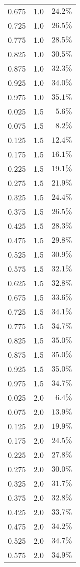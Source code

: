 \begin{longtable}{rrr}
0.675 & 1.0 & $24.2\%$ \\ 
0.725 & 1.0 & $26.5\%$ \\ 
0.775 & 1.0 & $28.5\%$ \\ 
0.825 & 1.0 & $30.5\%$ \\ 
0.875 & 1.0 & $32.3\%$ \\ 
0.925 & 1.0 & $34.0\%$ \\ 
0.975 & 1.0 & $35.1\%$ \\ 
0.025 & 1.5 & $5.6\%$ \\ 
0.075 & 1.5 & $8.2\%$ \\ 
0.125 & 1.5 & $12.4\%$ \\ 
0.175 & 1.5 & $16.1\%$ \\ 
0.225 & 1.5 & $19.1\%$ \\ 
0.275 & 1.5 & $21.9\%$ \\ 
0.325 & 1.5 & $24.4\%$ \\ 
0.375 & 1.5 & $26.5\%$ \\ 
0.425 & 1.5 & $28.3\%$ \\ 
0.475 & 1.5 & $29.8\%$ \\ 
0.525 & 1.5 & $30.9\%$ \\ 
0.575 & 1.5 & $32.1\%$ \\ 
0.625 & 1.5 & $32.8\%$ \\ 
0.675 & 1.5 & $33.6\%$ \\ 
0.725 & 1.5 & $34.1\%$ \\ 
0.775 & 1.5 & $34.7\%$ \\ 
0.825 & 1.5 & $35.0\%$ \\ 
0.875 & 1.5 & $35.0\%$ \\ 
0.925 & 1.5 & $35.0\%$ \\ 
0.975 & 1.5 & $34.7\%$ \\ 
0.025 & 2.0 & $6.4\%$ \\ 
0.075 & 2.0 & $13.9\%$ \\ 
0.125 & 2.0 & $19.9\%$ \\ 
0.175 & 2.0 & $24.5\%$ \\ 
0.225 & 2.0 & $27.8\%$ \\ 
0.275 & 2.0 & $30.0\%$ \\ 
0.325 & 2.0 & $31.7\%$ \\ 
0.375 & 2.0 & $32.8\%$ \\ 
0.425 & 2.0 & $33.7\%$ \\ 
0.475 & 2.0 & $34.2\%$ \\ 
0.525 & 2.0 & $34.7\%$ \\ 
0.575 & 2.0 & $34.9\%$ \\ 

\end{longtable}
